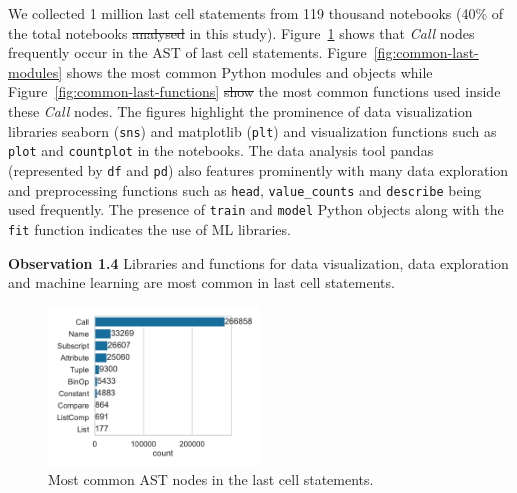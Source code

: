 \documentclass[smallextended]{svjour3}       %
\newcommand{\highlight}[1]{\begin{framed}%
  \noindent#1
\end{framed}}
\providecommand{\DIFadd}[1]{{\protect\color{blue}\uwave{#1}}} %
\providecommand{\DIFdel}[1]{{\protect\color{red}\sout{#1}}} %
\providecommand{\DIFaddbegin}{} %
\providecommand{\DIFaddend}{} %
\providecommand{\DIFdelbegin}{} %
\providecommand{\DIFdelend}{} %
\newcommand{\DIFscaledelfig}{0.5}
\newlength{\DIFdelgraphicswidth} %
\newlength{\DIFdelgraphicsheight} %
\newcommand{\DIFaddincludegraphics}[2][]{{\color{blue}\fbox{\DIFOincludegraphics[#1]{#2}}}} %
\newcommand{\DIFdelincludegraphics}[2][]{%
\sbox{\DIFdelgraphicsbox}{\DIFOincludegraphics[#1]{#2}}%
\settoboxwidth{\DIFdelgraphicswidth}{\DIFdelgraphicsbox} %
\settoboxtotalheight{\DIFdelgraphicsheight}{\DIFdelgraphicsbox} %
\scalebox{\DIFscaledelfig}{%
\parbox[b]{\DIFdelgraphicswidth}{\usebox{\DIFdelgraphicsbox}\\[-\baselineskip] \rule{\DIFdelgraphicswidth}{0em}}\llap{\resizebox{\DIFdelgraphicswidth}{\DIFdelgraphicsheight}{%
\setlength{\unitlength}{\DIFdelgraphicswidth}%
\begin{picture}(1,1)%
\thicklines\linethickness{2pt} %
{\color[rgb]{1,0,0}\put(0,0){\framebox(1,1){}}}%
{\color[rgb]{1,0,0}\put(0,0){\line( 1,1){1}}}%
{\color[rgb]{1,0,0}\put(0,1){\line(1,-1){1}}}%
\end{picture}%
}\hspace*{3pt}}} %
} %
\DeclareRobustCommand{\DIFaddbegin}{\DIFOaddbegin \let\includegraphics\DIFaddincludegraphics} %
\DeclareRobustCommand{\DIFaddend}{\DIFOaddend \let\includegraphics\DIFOincludegraphics} %
\DeclareRobustCommand{\DIFdelbegin}{\DIFOdelbegin \let\includegraphics\DIFdelincludegraphics} %
\DeclareRobustCommand{\DIFdelend}{\DIFOaddend \let\includegraphics\DIFOincludegraphics} %
\begin{document}
We collected 1 million last cell statements from 119 thousand notebooks (40\% of the total notebooks \DIFdelbegin \DIFdel{analysed }\DIFdelend \DIFaddbegin \DIFadd{analyzed }\DIFaddend in this study). Figure~\ref{fig:common-last-nodes} shows that \emph{Call} nodes frequently occur in the AST of last cell statements. Figure~\ref{fig:common-last-modules} shows the most common Python modules and objects while Figure~\ref{fig:common-last-functions} \DIFdelbegin \DIFdel{show }\DIFdelend \DIFaddbegin \DIFadd{shows }\DIFaddend the most common functions used inside these \emph{Call} nodes. The figures highlight the prominence of data visualization libraries seaborn (\lstinline{sns}) and matplotlib (\lstinline{plt}) and visualization functions such as \lstinline{plot} and \lstinline{countplot} in the notebooks. The data analysis tool pandas (represented by \lstinline{df} and \lstinline{pd}) also features prominently with many data exploration and preprocessing functions such as \lstinline{head}, \lstinline{value_counts} and \lstinline{describe} being used frequently. The presence of \lstinline{train} and \lstinline{model} Python objects along with the \lstinline{fit} function indicates the use of ML libraries.

\DIFdelbegin %
\DIFdelend \DIFaddbegin \highlight{\textbf{Observation 1.4} Libraries and functions for data visualization, data exploration and machine learning are most common in last cell statements.}
\DIFaddend 

\begin{figure}
	\centering
	\includegraphics[width=0.5\textwidth]{common-last-nodes.pdf}
	\caption{Most common AST nodes in the last cell statements.}
	\label{fig:common-last-nodes}
\end{figure}
\end{document}
